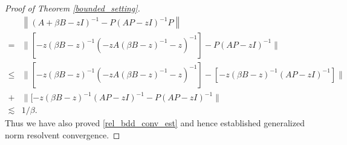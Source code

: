 \documentclass[reqno,12pt,letterpaper]{amsart}
\numberwithin{equation}{section}
\newcommand{\1}{\mathds{1}}
\theoremstyle{definition}
\begin{document}
\begin{proof}[Proof of Theorem \ref{bounded_setting}]
	\begin{align}
		&\left\| (A + \beta B - z I)^{-1} - P ( A P - z I)^{-1} P \right\|\\
		=& \| [-z(\beta B -z)^{-1} (-zA(\beta B -z)^{-1} - z)^{-1}] -  P ( A P - z I)^{-1}    \| \\
		\leq &     
		\| [-z(\beta B -z)^{-1} (-zA(\beta B -z)^{-1} - z)^{-1}] -  [-z(\beta B -z)^{-1}( A P - z I)^{-1} ]   \| \\
		+& \| [-z(\beta B -z)^{-1}( A P - z I)^{-1}  -  P ( A P - z I)^{-1}    \|\\
		\lesssim &1/\beta.
	\end{align}
	Thus we have also proved \ref{rel_bdd_conv_est} and hence established generalized norm resolvent convergence.
\end{proof}


	

	
	
\end{document}
